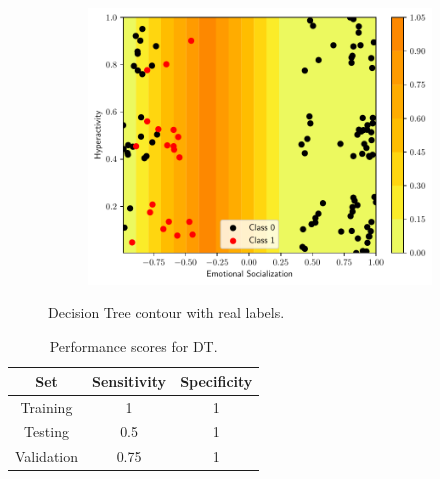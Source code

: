 \documentclass[conference]{IEEEtran}
\theoremstyle{definition}
\theoremstyle{remark}
\theoremstyle{remark}
\begin{document}
\begin{figure}
\begin{subfigure}[b]{0.32\textwidth}
        \includegraphics[width=\textwidth]{figs/tree-contour-2-5.pdf}
        \caption{}
    \end{subfigure}
    \caption{Decision Tree contour with real labels.}
    \label{fig:dts}
\end{figure}

\begin{table}
\centering
\caption{Performance scores for DT.}
\label{tab:DT}
\begin{tabular}{ccc}
\hline
\textbf{Set} & \multicolumn{1}{c}{\textbf{Sensitivity}} & \multicolumn{1}{c}{\textbf{Specificity}} \\ \hline
Training & 1 & 1 \\
Testing & 0.5 & 1 \\
Validation & 0.75 & 1 \\ \hline
\end{tabular}
\end{table}
\end{document}
